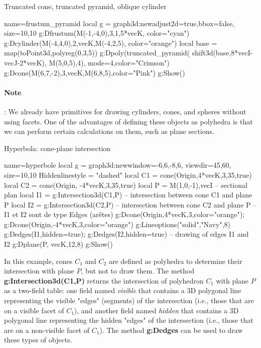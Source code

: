 \begin{demo}{Truncated cone, truncated pyramid, oblique cylinder}
\begin{luadraw}{name=frustum_pyramid}
local g = graph3d:new{adjust2d=true,bbox=false, size={10,10} }
g:Dfrustum(M(-1,-4,0),3,1,5*vecK, {color="cyan"})
g:Dcylinder(M(-4,4,0),2,vecK,M(-4,2,5), {color="orange"})
local base = map(toPoint3d,polyreg(0,3,5))
g:Dpoly(truncated_pyramid( shift3d(base,8*vecI-vecJ-2*vecK), M(5,0,5),4), {mode=4,color="Crimson"})
g:Dcone(M(6,7,-2),3,vecK,M(6,8,5),{color="Pink"})
g:Show()            
\end{luadraw}
\end{demo}

\paragraph{Note}: We already have primitives for drawing cylinders, cones, and spheres without using facets. One of the advantages of defining these objects as polyhedra is that we can perform certain calculations on them, such as plane sections.

\begin{demo}{Hyperbola: cone-plane intersection}
\begin{luadraw}{name=hyperbole}
local g = graph3d:new{window={-6,6,-8,6}, viewdir={45,60}, size={10,10}}
Hiddenlinestyle = "dashed"
local C1 = cone(Origin,4*vecK,3,35,true)
local C2 = cone(Origin, -4*vecK,3,35,true)
local P = {M(1,0,-1),vecI} -- sectional plan
local I1 = g:Intersection3d(C1,P) -- intersection between cone C1 and plane P
local I2 = g:Intersection3d(C2,P) -- intersection between cone C2 and plane P
-- I1 et I2 sont de type Edges (arêtes)
g:Dcone(Origin,4*vecK,3,{color="orange"}); g:Dcone(Origin,-4*vecK,3,{color="orange"})
g:Lineoptions("solid","Navy",8)
g:Dedges(I1,{hidden=true}); g:Dedges(I2,{hidden=true}) -- drawing of edges I1 and I2
g:Dplane(P, vecK,12,8)
g:Show()
\end{luadraw}
\end{demo}

In this example, cones $C_1$ and $C_2$ are defined as polyhedra to determine their intersection with plane $P$, but not to draw them. The method \textbf{g:Intersection3d(C1,P)} returns the intersection of polyhedron $C_1$ with plane $P$ as a two-field table: one field named \emph{visible} that contains a 3D polygonal line representing the visible "edges" (segments) of the intersection (i.e., those that are on a visible facet of $C_1$), and another field named \emph{hidden} that contains a 3D polygonal line representing the hidden "edges" of the intersection (i.e., those that are on a non-visible facet of $C_1$). The method \textbf{g:Dedges} can be used to draw these types of objects.

